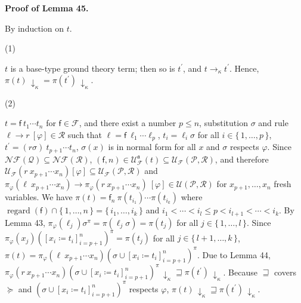 
 
 
 
\par\medskip\noindent\textbf{Proof of Lemma 45.}\par
 
 
By induction on $t$.\par
  
\par\noindent  (1) 
 
$t$ is a base-type ground theory term; then so is $t^{\prime}$, and $t\rightarrow_{\kappa}t^{\prime}$. Hence, $\pi(t)\,{\downarrow}_{\kappa}=\pi(t^{\prime})\,{\downarrow}_{\kappa}$.\par
 
 
 
\par\noindent  (2) 
 
$t={\mathsf{f}}\ {{t}_{1}\cdots{t}_{n}}$ for $\mathsf{f}\in\mathcal{F}$, and there exist a number $p\leq n$, substitution $\sigma$ and rule ${\ell}\rightarrow{r}\ [\varphi]\in\mathcal{R}$ such that $\ell={\mathsf{f}}\ {{\ell}_{1}\cdots{\ell}_{p}}$, $t_{i}=\ell_{i}\sigma$ for all $i\in\{\,1,\ldots,p\,\}$, $t^{\prime}={(r\sigma)}\ {{t}_{p+1}\cdots{t}_{n}}$, $\sigma(x)$ is in normal form for all $x$ and $\sigma$ respects $\varphi$. Since $\mathcal{N}\!\mathcal{F}(\mathcal{Q})\subseteq\mathcal{N}\!\mathcal{F}(\mathcal{R})$, $(\mathsf{f},n)\in\mathcal{U}_{\mathcal{F}}^{\mathfrak{a}}(t)\subseteq\mathcal{U}_{\mathcal{F}}(\mathcal{P},\mathcal{R})$, and therefore $\mathcal{U}_{\mathcal{F}}({r}\ {{x}_{p+1}\cdots{x}_{n}})[\varphi]\subseteq\mathcal{U}_{\mathcal{F}}(\mathcal{P},\mathcal{R})$ and ${\pi_{\varphi}({\ell}\ {{x}_{p+1}\cdots{x}_{n}})}\rightarrow{\pi_{\varphi}({r}\ {{x}_{p+1}\cdots{x}_{n}})}\ [\varphi]\in\mathcal{U}(\mathcal{P},\mathcal{R})$ for ${x}_{p+1},\ldots,{x}_{n}$ fresh variables. We have $\pi(t)={\mathsf{f}_{n}}\ {\pi(t_{i_{1}})\cdots\pi(t_{i_{k}})}$ where $\operatorname{regard}(\mathsf{f})\cap\{\,1,\ldots,n\,\}=\{\,{i}_{1},\ldots,{i}_{k}\,\}$ and ${i}_{1}<\cdots<{i}_{l}\leq p<{i}_{l+1}<\cdots<{i}_{k}$. By Lemma 43, $\pi_{\varphi}(\ell_{j})\sigma^{\pi}=\pi(\ell_{j}\sigma)=\pi(t_{j})$ for all $j\in\{\,1,\ldots,l\,\}$. Since $\pi_{\varphi}(x_{j})([{x_{i}}\coloneq{t_{i}}]_{i=p+1}^{n})^{\pi}=\pi(t_{j})$ for all $j\in\{\,l+1,\ldots,k\,\}$, $\pi(t)=\pi_{\varphi}({\ell}\ {{x}_{p+1}\cdots{x}_{n}})(\sigma\cup[{x_{i}}\coloneq{t_{i}}]_{i=p+1}^{n})^{\pi}$. Due to Lemma 44, $\pi_{\varphi}({r}\ {{x}_{p+1}\cdots{x}_{n}})(\sigma\cup[{x_{i}}\coloneq{t_{i}}]_{i=p+1}^{n})^{\pi}\,{\downarrow}_{\kappa}\sqsupseteq\pi(t^{\prime})\,{\downarrow}_{\kappa}$. Because $\sqsupseteq$ covers $\succeq$ and $(\sigma\cup[{x_{i}}\coloneq{t_{i}}]_{i=p+1}^{n})^{\pi}$ respects $\varphi$, $\pi(t)\,{\downarrow}_{\kappa}\sqsupseteq\pi(t^{\prime})\,{\downarrow}_{\kappa}$.\par
 
